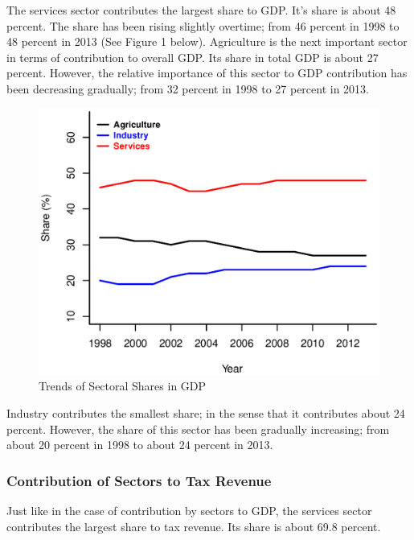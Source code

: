 \documentclass[12pt,a4paper,final]{article}
\begin{document}
The services sector contributes the largest share to GDP.  It's share is about 48 percent.  The share has been rising slightly overtime; from 46 percent in 1998 to 48 percent in 2013 (See Figure 1 below). Agriculture is the next important sector in terms of contribution to overall GDP.  Its share in total GDP is about 27 percent.  However, the relative importance of this sector to GDP contribution has been decreasing gradually; from 32 percent in 1998 to 27 percent in 2013.
\begin{figure}[hbt]
\centering
\begin{small}
\caption{Trends of Sectoral Shares in GDP}
\end{small}
\includegraphics[scale=0.501]{shares.eps} 
\end{figure}

Industry contributes the smallest share; in the sense that it contributes about 24 percent.  However, the share of this sector has been gradually increasing; from about 20 percent in 1998 to about 24 percent in 2013.


\subsubsection{Contribution of Sectors to Tax Revenue}

Just like in the case of contribution by sectors to GDP, the services sector contributes the largest share to tax revenue.  Its share is about 69.8 percent. 
\end{document}
